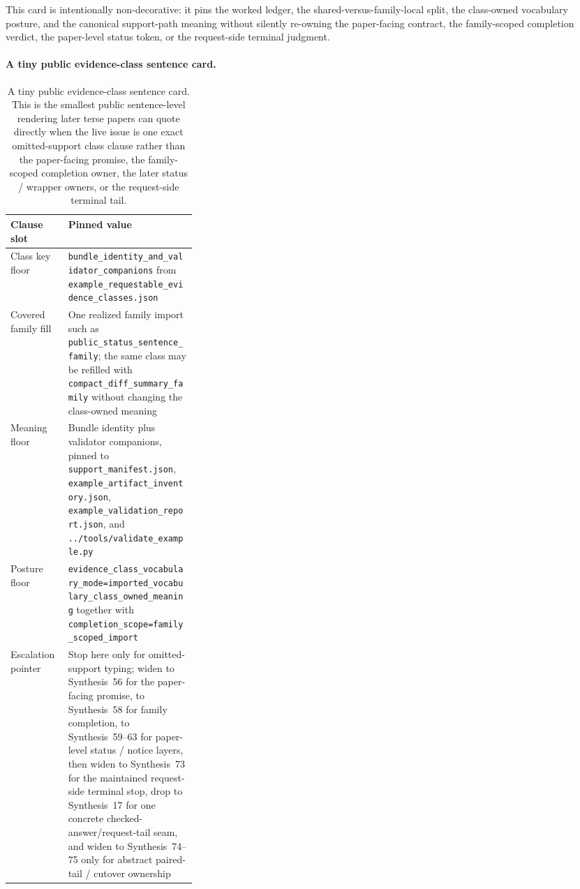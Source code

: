 \documentclass[11pt]{article}
\begin{document}
This card is intentionally non-decorative: it pins the worked ledger, the shared-versus-family-local split, the class-owned vocabulary posture, and the canonical support-path meaning without silently re-owning the paper-facing contract, the family-scoped completion verdict, the paper-level status token, or the request-side terminal judgment.\cite{series:workedexample}

\paragraph{A tiny public evidence-class sentence card.}
\begin{table}[t]
\centering
\small
\begin{tabularx}{0.97\linewidth}{@{}p{0.31\linewidth}X@{}}
\toprule
\textbf{Clause slot} & \textbf{Pinned value}\\
\midrule
Class key floor & \nolinkurl{bundle_identity_and_validator_companions} from \nolinkurl{example_requestable_evidence_classes.json}\\
Covered family fill & One realized family import such as \nolinkurl{public_status_sentence_family}; the same class may be refilled with \nolinkurl{compact_diff_summary_family} without changing the class-owned meaning\\
Meaning floor & Bundle identity plus validator companions, pinned to \nolinkurl{support_manifest.json}, \nolinkurl{example_artifact_inventory.json}, \nolinkurl{example_validation_report.json}, and \nolinkurl{../tools/validate_example.py}\\
Posture floor & \nolinkurl{evidence_class_vocabulary_mode=imported_vocabulary_class_owned_meaning} together with \nolinkurl{completion_scope=family_scoped_import}\\
Escalation pointer & Stop here only for omitted-support typing; widen to Synthesis~56 for the paper-facing promise, to Synthesis~58 for family completion, to Synthesis~59--63 for paper-level status / notice layers, then widen to Synthesis~73 for the maintained request-side terminal stop, drop to Synthesis~17 for one concrete checked-answer/request-tail seam, and widen to Synthesis~74--75 only for abstract paired-tail / cutover ownership\\
\bottomrule
\end{tabularx}
\caption{A tiny public evidence-class sentence card. This is the smallest public sentence-level rendering later terse papers can quote directly when the live issue is one exact omitted-support class clause rather than the paper-facing promise, the family-scoped completion owner, the later status / wrapper owners, or the request-side terminal tail.}
\label{tab:tiny-public-evidence-class-sentence-card}
\end{table}
\end{document}
